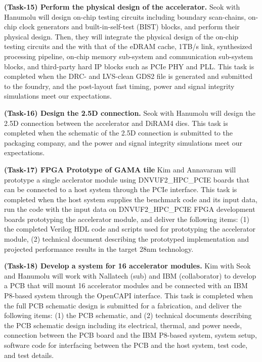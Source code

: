 \vspace{3pt}
\noindent
\textbf{(Task-15) Perform the physical design of the accelerator.} 
Seok with Hanumolu will design on-chip testing circuits including boundary scan-chains, on-chip clock generators and built-in-self-test (BIST) blocks, and perform their physical design.
Then, they will integrate the physical design of the on-chip testing circuits and the with that of the eDRAM cache, 1TB/s link, synthesized processing pipeline, on-chip memory sub-system and communication sub-system blocks, and third-party hard IP blocks such as PCIe PHY and PLL.
This task is completed when the DRC- and LVS-clean GDS2 file is generated and submitted to the foundry, and the post-layout fast timing, power and signal integrity simulations meet our expectations.


\vspace{3pt}
\noindent
\textbf{(Task-16) Design the 2.5D connection.} 
Seok with Hanumolu will design the 2.5D connection between the accelerator and DiRAM4 dies.
This task is completed when the schematic of the 2.5D connection is submitted to the packaging company, and the power and signal integrity simulations meet our expectations.


\vspace{3pt}
\noindent
\textbf{(Task-17) FPGA Prototype of GAMA tile}
Kim and Annavaram will prototype a single acclerator module using DNVUF2\_HPC\_PCIE boards that can be connected to a host system through the PCIe interface.
This task is completed when the host system supplies the benchmark code and its input data, run the code with the input data on DNVUF2\_HPC\_PCIE FPGA development boards prototyping the accelerator module, and deliver the following items:
(1) the completed Verilog HDL code and scripts used for prototyping the accelerator module,  
(2) technical document describing the prototyped implementation and projected performance results in the target 28nm technology.


\vspace{3pt}
\noindent
\textbf{(Task-18) Develop a system for 16 accelerator modules.}
Kim with Seok and Hanumolu will work with Nallatech (sub) and IBM (collaborator) to develop a PCB that will mount 16 accelerator modules and be connected with an IBM P8-based system through the OpenCAPI interface.
This task is completed when the full PCB schematic design is submitted for a fabrication, and deliver the following items:
(1) the PCB schematic, and
(2) technical documents describing the PCB schematic design including its electrical, thermal, and power needs, connection between the PCB board and the IBM P8-based system, 
system setup, software code for interfacing between the PCB and the host system, test code, and test details. 


